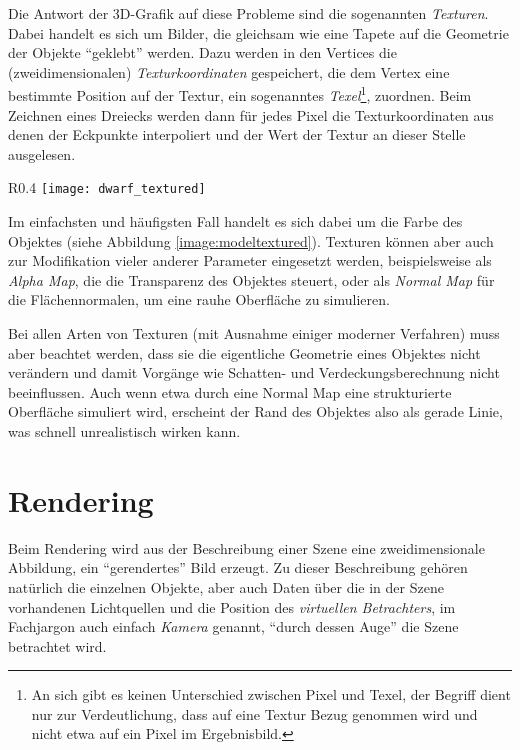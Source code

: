 Die Antwort der 3D-Grafik auf diese Probleme sind die sogenannten \emph{Texturen}. Dabei handelt es sich um Bilder, die gleichsam wie eine Tapete auf die Geometrie der Objekte \enquote{geklebt} werden. Dazu werden in den Vertices die (zweidimensionalen) \emph{Texturkoordinaten} gespeichert, die dem Vertex eine bestimmte Position auf der Textur, ein sogenanntes \emph{Texel}\footnote{An sich gibt es keinen Unterschied zwischen Pixel und Texel, der Begriff dient nur zur Verdeutlichung, dass auf eine Textur Bezug genommen wird und nicht etwa auf ein Pixel im Ergebnisbild.}, zuordnen. Beim Zeichnen eines Dreiecks werden dann für jedes Pixel die Texturkoordinaten aus denen der Eckpunkte interpoliert und der Wert der Textur an dieser Stelle ausgelesen.

\begin{wrapfigure}{R}{0.4\textwidth}
  \texttt{[image: dwarf\_textured]}
  \label{image:modeltextured}
  \vspace{-10pt}
  \caption{Diffuse Textur kombiniert mit Gouraud Shading.}
\end{wrapfigure}

Im einfachsten und häufigsten Fall handelt es sich dabei um die Farbe des Objektes (siehe Abbildung \ref{image:modeltextured}). Texturen können aber auch zur Modifikation vieler anderer Parameter eingesetzt werden, beispielsweise als \emph{Alpha Map}, die die Transparenz des Objektes steuert, oder als \emph{Normal Map} für die Flächennormalen, um eine rauhe Oberfläche zu simulieren.

Bei allen Arten von Texturen (mit Ausnahme einiger moderner Verfahren) muss aber beachtet werden, dass sie die eigentliche Geometrie eines Objektes nicht verändern und damit Vorgänge wie Schatten- und Verdeckungsberechnung nicht beeinflussen. Auch wenn etwa durch eine Normal Map eine strukturierte Oberfläche simuliert wird, erscheint der Rand des Objektes also als gerade Linie, was schnell unrealistisch wirken kann.

\section{Rendering}
\label{rendering}
Beim Rendering wird aus der Beschreibung einer Szene eine zweidimensionale Abbildung, ein \enquote{gerendertes} Bild erzeugt. Zu dieser Beschreibung gehören natürlich die einzelnen Objekte, aber auch Daten über die in der Szene vorhandenen Lichtquellen und die Position des \emph{virtuellen Betrachters}, im Fachjargon auch einfach \emph{Kamera} genannt, \enquote{durch dessen Auge} die Szene betrachtet wird.

